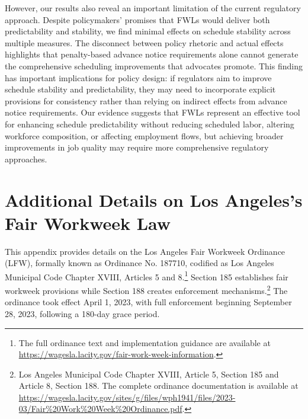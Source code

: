 \documentclass[letterpaper,11pt,leqno]{article}
\theoremstyle{paper}
\renewcommand{\thetable}{A\arabic{table}}
\renewcommand{\thefigure}{A\arabic{figure}}
\newcommand{\bib}{bibliography.bib}
\begin{document}
However, our results also reveal an important limitation of the current regulatory approach. Despite policymakers' promises that FWLs would deliver both predictability and stability, we find minimal effects on schedule stability across multiple measures. The disconnect between policy rhetoric and actual effects highlights that penalty-based advance notice requirements alone cannot generate the comprehensive scheduling improvements that advocates promote. This finding has important implications for policy design: if regulators aim to improve schedule stability and predictability, they may need to incorporate explicit provisions for consistency rather than relying on indirect effects from advance notice requirements. Our evidence suggests that FWLs represent an effective tool for enhancing schedule predictability without reducing scheduled labor, altering workforce composition, or affecting employment flows, but achieving broader improvements in job quality may require more comprehensive regulatory approaches.



\pagebreak 

\newpage 
\setcounter{page}{1}

\appendix
\renewcommand{\thefigure}{A\arabic{figure}}
\renewcommand{\thetable}{A\arabic{table}}
\setcounter{figure}{0}  %
\setcounter{table}{0}   %

\section{Additional Details on Los Angeles's Fair Workweek Law} \label{subsec:fwl_details}

This appendix provides details on the Los Angeles Fair Workweek Ordinance (LFW), formally known as Ordinance No. 187710, codified as Los Angeles Municipal Code Chapter XVIII, Articles 5 and 8.\footnote{The full ordinance text and implementation guidance are available at \url{https://wagesla.lacity.gov/fair-work-week-information}.} Section 185 establishes fair workweek provisions while Section 188 creates enforcement mechanisms.\footnote{Los Angeles Municipal Code Chapter XVIII, Article 5, Section 185 and Article 8, Section 188. The complete ordinance documentation is available at \url{https://wagesla.lacity.gov/sites/g/files/wph1941/files/2023-03/Fair\%20Work\%20Week\%20Ordinance.pdf}.} The ordinance took effect April 1, 2023, with full enforcement beginning September 28, 2023, following a 180-day grace period.
\end{document}
